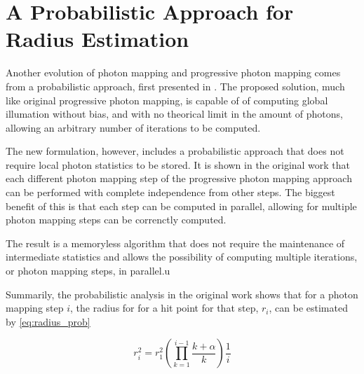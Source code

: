 \documentclass[main.tex]{subfiles}
\begin{document}
\section{A Probabilistic Approach for Radius Estimation} \label{section:ppmpa}


Another evolution of photon mapping and progressive photon mapping comes from a probabilistic approach, first presented in \cite{knaus2011progressive}. The proposed solution, much like original progressive photon mapping, is capable of of computing global illumation without bias, and with no theorical limit in the amount of photons, allowing an arbitrary number of iterations to be computed.

The new formulation, however, includes a probabilistic approach that does not require local photon statistics to be stored. It is shown in the original work that each different photon mapping step of the progressive photon mapping approach can be performed with complete independence from other steps. The biggest benefit of this is that each step can be computed in parallel, allowing for multiple photon mapping steps can be correnctly computed.



The result is a memoryless algorithm that does not require the maintenance of intermediate statistics and allows the possibility of computing multiple iterations, or photon mapping steps, in parallel.u

Summarily, the probabilistic analysis in the original work shows that for a photon mapping step $i$, the radius for for a hit point for that step, $r_{i}$, can be estimated by \cref{eq:radius_prob}

\begin{figure}[!htp]
  \begin{equation}
    r^{2}_{i} = r^{2}_{1} (\prod\limits^{i-1}_{k=1} \frac{k + \alpha}{k}) \frac{1}{i}
  \label{eq:radius_prob}
  \end{equation}
\end{figure}


\end{document}
